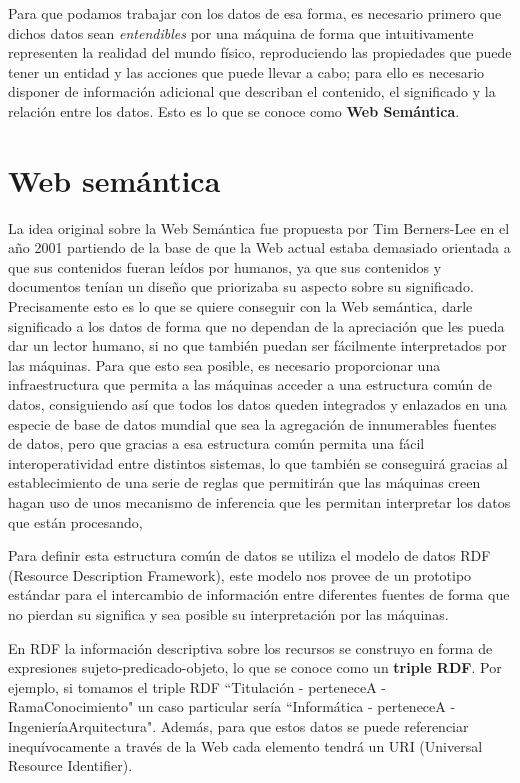 \bigskip
Para que podamos trabajar con los datos de esa forma, es necesario primero que dichos datos sean \textit{entendibles} por una máquina de forma que intuitivamente representen la realidad del mundo físico, reproduciendo las propiedades que puede tener un entidad y las acciones que puede llevar a cabo; para ello es necesario disponer de información adicional que describan el contenido, el significado y la relación entre los datos. Esto es lo que se conoce como \textbf{Web Semántica}.

\section{Web semántica}
La idea original sobre la Web Semántica fue propuesta por {\sf Tim Berners-Lee} en el año 2001 partiendo de la base de que {\sf la Web actual} estaba demasiado orientada a que sus contenidos fueran leídos por humanos, ya que sus contenidos y documentos tenían un diseño que priorizaba su aspecto sobre su significado. Precisamente esto es lo que se quiere conseguir con {\sf la Web semántica}, darle significado a los datos de forma que no dependan de la apreciación que les pueda dar un lector humano, si no que también puedan ser fácilmente interpretados por las máquinas. Para que esto sea posible, es necesario proporcionar una infraestructura que permita a las máquinas acceder a una estructura común de datos, consiguiendo así que todos los datos queden integrados y enlazados en una especie de base de datos mundial que sea la agregación de innumerables fuentes de datos, pero que gracias a esa estructura común permita una fácil interoperatividad entre distintos sistemas, lo que también se conseguirá gracias al establecimiento de una serie de reglas que permitirán que las máquinas creen hagan uso de unos mecanismo de inferencia que les permitan interpretar los datos que están procesando, 

\bigskip
Para definir esta estructura común de datos se utiliza el modelo de datos {\sf RDF (Resource Description Framework)}, este modelo nos provee de un prototipo estándar para el intercambio de información entre diferentes fuentes de forma que no pierdan su significa y sea posible su interpretación por las máquinas. 

\newpage
En {\sf RDF} la información descriptiva sobre los recursos se construyo en forma de expresiones sujeto-predicado-objeto, lo que se conoce como un \textbf{triple RDF}. Por ejemplo, si tomamos el triple RDF ``Titulación - perteneceA - RamaConocimiento" un caso particular sería ``Informática - perteneceA - IngenieríaArquitectura". Además, para que estos datos se puede referenciar inequívocamente a través de la Web cada elemento tendrá un {\sf URI (Universal Resource Identifier)}.

